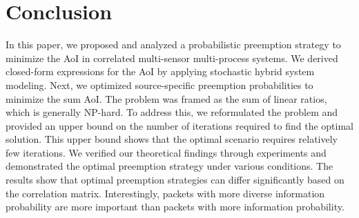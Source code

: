 \vspace{-4pt}
\section{Conclusion}\label{conc}

In this paper, we proposed and analyzed a probabilistic preemption strategy to minimize the AoI in correlated multi-sensor multi-process systems. We derived closed-form expressions for the AoI by applying stochastic hybrid system modeling. Next, we optimized source-specific preemption probabilities to minimize the sum AoI. The problem was framed as the sum of linear ratios, which is generally NP-hard. To address this, we reformulated the problem and provided an upper bound on the number of iterations required to find the optimal solution. This upper bound shows that the optimal scenario requires relatively few iterations. We verified our theoretical findings through experiments and demonstrated the optimal preemption strategy under various conditions. The results show that optimal preemption strategies can differ significantly based on the correlation matrix. Interestingly, packets with more diverse information probability are more important than packets with more information probability. 




